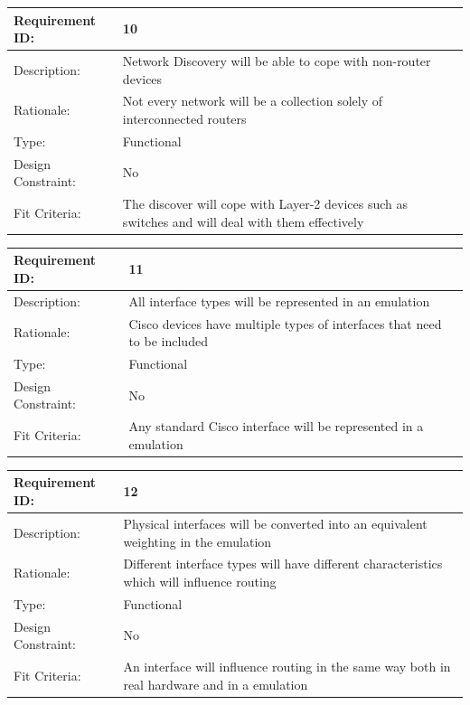 \documentclass[11pt]{report}
\begin{document}
\newline
\vspace*{0.5 cm}
\newline
\begin{tabular}{|l|p{12cm}|}
	\hline Requirement ID: & 10 \\ 
	\hline Description: & Network Discovery will be able to cope with non-router devices \\ 
	\hline Rationale: & Not every network will be a collection solely of interconnected routers \\ 
	\hline Type: & Functional \\ 
	\hline Design Constraint: & No \\ 
	\hline Fit Criteria: & The discover will cope with Layer-2 devices such as switches and will deal with them effectively \\ 
	\hline 
\end{tabular}
\newline
\vspace*{0.5 cm}
\newline
\begin{tabular}{|l|p{12cm}|}
	\hline Requirement ID: & 11 \\ 
	\hline Description: & All interface types will be represented in an emulation \\ 
	\hline Rationale: & Cisco devices have multiple types of interfaces that need to be included \\ 
	\hline Type: & Functional \\ 
	\hline Design Constraint: & No \\ 
	\hline Fit Criteria: & Any standard Cisco interface will be represented in a emulation \\ 
	\hline 
\end{tabular}
\newline
\vspace*{0.5 cm}
\newline
\begin{tabular}{|l|p{12cm}|}
	\hline Requirement ID: & 12 \\ 
	\hline Description: & Physical interfaces will be converted into an equivalent weighting in the emulation \\ 
	\hline Rationale: & Different interface types will have different characteristics which will influence routing \\ 
	\hline Type: & Functional \\ 
	\hline Design Constraint: & No \\ 
	\hline Fit Criteria: & An interface will influence routing in the same way both in real hardware and in a emulation \\ 
	\hline 
\end{tabular}
\end{document}
